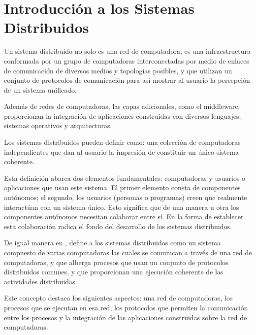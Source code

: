 


\chapter{Introducción a los Sistemas Distribuidos}
\label{cap:def-SD}

Un sistema distribuido no solo es una  red de computadora; es una infraestructura conformada por un grupo de computadoras interconectadas por medio de enlaces de comunicación de diversos medios y topologías posibles, y que utilizan un conjunto  de protocolos de comunicación para así mostrar al usuario la percepción de un sistema unificado.

Además de redes de computadoras, las capas adicionales, como el \gls{middleware}, proporcionan  la  integración de  aplicaciones construidas con diversos lenguajes, sistemas operativos y arquitecturas.
  
Los {sistemas distribuidos}  pueden definir  
como: una colección de computadoras independientes que dan al usuario la impresión de constituir un único sistema coherente. 

Esta definición \cite{Steen2017} abarca dos elementos fundamentales:  computadoras y  usuarios o aplicaciones que usan este sistema. El primer elemento  consta de componentes   autónomos; el segundo,  los usuarios (personas o programas) creen que realmente interactúan con un sistema único.  Esto significa que de una manera u otra los componentes autónomos necesitan colaborar entre sí. En la forma de establecer esta colaboración radica  el fondo del desarrollo de los sistemas distribuidos.

De igual manera en  \cite{Verissimo2012},  define a los sistemas distribuidos como un sistema compuesto de varias computadoras las cuales se comunican a través de una red de computadoras, y que alberga procesos que usan un conjunto de protocolos distribuidos comunes, y que proporcionan una ejecución coherente de las actividades distribuidas.

Este concepto destaca los siguientes aspectos: una red de computadoras, los procesos que se ejecutan en esa red, los protocolos  que permiten la comunicación  entre los procesos y la integración de las aplicaciones construidas sobre la red de computadoras. 

